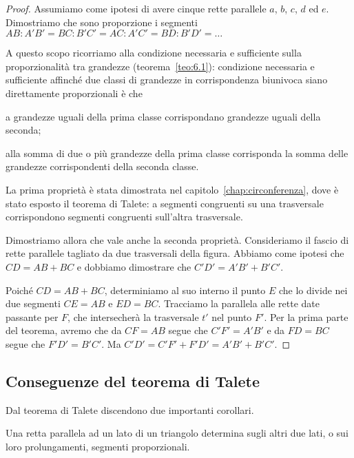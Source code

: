 \begin{proof}
Assumiamo come ipotesi di avere cinque rette parallele $a$, $b$, $c$, $d$ ed $e$. Dimostriamo che sono proporzione i segmenti 
$AB : A'B' = BC : B'C' = AC : A'C' = BD : B'D' = \ldots{}$

A questo scopo ricorriamo alla condizione necessaria e sufficiente sulla proporzionalità tra grandezze (teorema~\ref{teo:6.1}):
condizione necessaria e sufficiente affinché due classi di grandezze in corrispondenza biunivoca siano direttamente proporzionali è che
\begin{itemize*}
\item a grandezze uguali della prima classe corrispondano grandezze uguali della seconda;
\item alla somma di due o più grandezze della prima classe corrisponda la somma delle grandezze corrispondenti della seconda classe.
\end{itemize*}

La prima proprietà è stata dimostrata nel capitolo~\ref{chap:circonferenza}, dove è stato esposto il teorema di Talete: a segmenti congruenti su una trasversale corrispondono segmenti congruenti sull'altra trasversale.

Dimostriamo allora che vale anche la seconda proprietà.
Consideriamo il fascio di rette parallele tagliato da due trasversali della figura.
Abbiamo come ipotesi che $CD = AB + BC$ e dobbiamo dimostrare che $C'D' = A'B' + B'C'$.

Poiché $CD = AB + BC$, determiniamo al suo interno il punto $E$ che lo divide nei due segmenti $CE=AB$ e $ED=BC$. Tracciamo la parallela alle rette date passante per $F$, che intersecherà la trasversale $t'$ nel punto $F'$. Per la prima parte del teorema, avremo che da $CF=AB$ segue che $C'F' = A'B'$ e da $FD = BC$ segue che $F'D'=B'C'$. Ma $C'D'=C'F' + F'D' = A'B' + B'C'$.
\end{proof}

\subsection{Conseguenze del teorema di Talete}

Dal teorema di Talete discendono due importanti corollari.
\begin{corollario}\label{cor:6.1}
Una retta parallela ad un lato di un triangolo determina sugli altri due lati, o sui loro prolungamenti, segmenti proporzionali.
\end{corollario}

